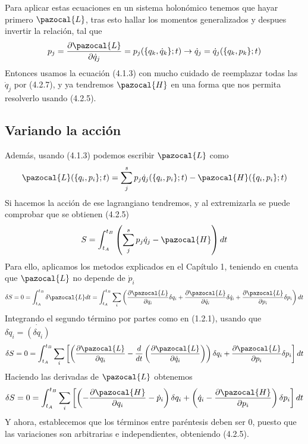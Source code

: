 Para aplicar estas ecuaciones en un sistema holonómico tenemos que hayar primero $\pazocal{L}$, tras esto hallar los momentos generalizados y despues invertir la relación, tal que
\begin{equation} \label{4.2.7}
    p_j = \frac{\partial \pazocal{L}}{\partial \dot{q}_j}=p_j(\{q_k,\dot{q}_k\};t) \rightarrow \dot{q}_j = \dot{q}_j(\{q_k,p_k\};t)
\end{equation} 
Entonces usamos la ecuación (4.1.3) con mucho cuidado de reemplazar todas las $\dot{q}_j$ por (4.2.7), y ya tendremos $\pazocal{H}$ en una forma que nos permita resolverlo usando (4.2.5).
\subsection{Variando la acción}
Además, usando (4.1.3) podemos escribir $\pazocal{L}$ como
\begin{equation} \label{4.2.7}
    \pazocal{L}(\{q_i,p_i\};t) = \sum_j^s p_j \dot{q}_j (\{q_i,p_i\};t) -\pazocal{H}(\{q_i,p_i\};t)
\end{equation} 
Si hacemos la acción de ese lagrangiano tendremos, y al extremizarla se puede comprobar que se obtienen (4.2.5)
\begin{equation} \label{4.2.7}
    S = \int_{t_A}^{t_B} \left(\sum_j^s p_j \dot{q}_j -\pazocal{H}\right) dt
\end{equation} 
Para ello, aplicamos los metodos explicados en el Capítulo 1, teniendo en cuenta que $\pazocal{L}$ no depende de $\dot{p}_i$ 
\[
    \delta S = 0 = \int_{t_A}^{t_B} \delta \pazocal{L} dt = \int_{t_A}^{t_B} \sum_i\left(\frac{\partial \pazocal{L}}{\partial q_i} \delta q_i + \frac{\partial \pazocal{L}}{\partial \dot{q}_i} \delta \dot{q}_i + \frac{\partial \pazocal{L}}{\partial p_i} \delta p_i\right) dt
\]
Integrando el segundo término por partes como en (1.2.1), usando que $\delta \dot{q}_i =  \dot{(\delta q_i)}$
\[
    \delta S = 0 = \int_{t_A}^{t_B} \sum_{i}\left[\left(\frac{\partial \pazocal{L}}{\partial q_i} - \frac{d}{dt}\left(\frac{\partial \pazocal{L}}{\partial \dot{q}_i}\right)\right) \delta q_i + \frac{\partial \pazocal{L}}{\partial p_i}\delta p_i\right] dt
\]
Haciendo las derivadas de $\pazocal{L}$ obtenemos
\begin{equation} \label{4.2.7}
    \delta S = 0 = \int_{t_A}^{t_B} \sum_{i}\left[\left(-\frac{\partial \pazocal{H}}{\partial q_i} - \dot{p}_i\right) \delta q_i + \left(\dot{q}_i-\frac{\partial \pazocal{H}}{\partial p_i}\right)\delta p_i\right] dt
\end{equation} 
Y ahora, establecemos que los términos entre paréntesis deben ser 0, puesto que las variaciones son arbitrarias e independientes, obteniendo (4.2.5).
\vspace{-20pt}
